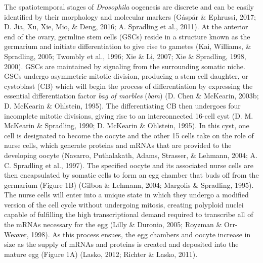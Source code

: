 \documentclass[12pt,oneside]{reedthesis}
\begin{document}
The spatiotemporal stages of \emph{Drosophila} oogenesis are discrete and can
be easily identified by their morphology and molecular markers
(Gáspár \& Ephrussi, 2017; D. Jia, Xu, Xie, Mio, \& Deng, 2016; A. Spradling et al., 2011). At the anterior end of
the ovary, germline stem cells (GSCs) reside in a structure known as the
germarium and initiate differentiation to give rise to gametes
(Kai, Williams, \& Spradling, 2005; Twombly et al., 1996; Xie \& Li, 2007; Xie \& Spradling, 1998, 2000). GSCs
are maintained by signaling from the surrounding somatic niche. GSCs
undergo asymmetric mitotic division, producing a stem cell daughter, or
cystoblast (CB) which will begin the process of differentiation by
expressing the essential differentiation factor \emph{bag of marbles} (\emph{bam})
(D. Chen \& McKearin, 2003b; D. McKearin \& Ohlstein, 1995). The differentiating CB then undergoes
four incomplete mitotic divisions, giving rise to an interconnected
16-cell cyst (D. M. McKearin \& Spradling, 1990; D. McKearin \& Ohlstein, 1995). In this cyst, one
cell is designated to become the oocyte and the other 15 cells take on
the role of nurse cells, which generate proteins and mRNAs that are
provided to the developing oocyte (Navarro, Puthalakath, Adams, Strasser, \& Lehmann, 2004; A. C. Spradling et al., 1997).
The specified oocyte and its associated nurse cells are then
encapsulated by somatic cells to form an egg chamber that buds off from
the germarium (Figure 1B) (Gilboa \& Lehmann, 2004; Margolis \& Spradling, 1995). The nurse
cells will enter into a unique state in which they undergo a modified
version of the cell cycle without undergoing mitosis, creating polyploid
nuclei capable of fulfilling the high transcriptional demand required to
transcribe all of the mRNAs necessary for the egg (Lilly \& Duronio, 2005; Royzman \& Orr-Weaver, 1998). As this process ensues, the egg chambers and oocyte
increase in size as the supply of mRNAs and proteins is created and
deposited into the mature egg (Figure 1A) (Lasko, 2012; Richter \& Lasko, 2011).
\end{document}

